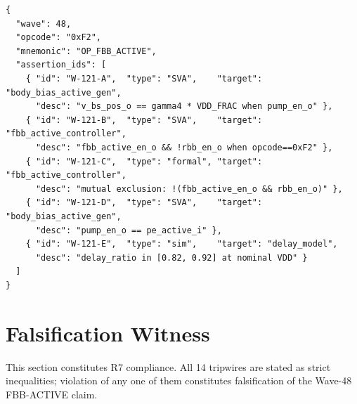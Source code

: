\documentclass[12pt,a4paper]{report}
\theoremstyle{plain}
\theoremstyle{definition}
\theoremstyle{remark}
\begin{document}
\begin{lstlisting}[language={},basicstyle=\ttfamily\small,frame=single,
  caption={\texttt{wave48\_fbb\_active.json} (excerpt).}]
{
  "wave": 48,
  "opcode": "0xF2",
  "mnemonic": "OP_FBB_ACTIVE",
  "assertion_ids": [
    { "id": "W-121-A",  "type": "SVA",    "target": "body_bias_active_gen",
      "desc": "v_bs_pos_o == gamma4 * VDD_FRAC when pump_en_o" },
    { "id": "W-121-B",  "type": "SVA",    "target": "fbb_active_controller",
      "desc": "fbb_active_en_o && !rbb_en_o when opcode==0xF2" },
    { "id": "W-121-C",  "type": "formal", "target": "fbb_active_controller",
      "desc": "mutual exclusion: !(fbb_active_en_o && rbb_en_o)" },
    { "id": "W-121-D",  "type": "SVA",    "target": "body_bias_active_gen",
      "desc": "pump_en_o == pe_active_i" },
    { "id": "W-121-E",  "type": "sim",    "target": "delay_model",
      "desc": "delay_ratio in [0.82, 0.92] at nominal VDD" }
  ]
}
\end{lstlisting}

\section{Falsification Witness}
\label{sec:falsification}

This section constitutes R7 compliance.  All 14 tripwires are stated as strict inequalities;
violation of any one of them constitutes falsification of the Wave-48 FBB-ACTIVE claim.
\end{document}
